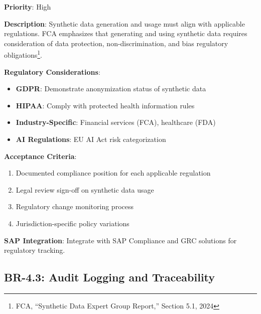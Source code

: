 \begin{tcolorbox}[colback=red!5,colframe=red!70,title=BR-4.2: Compliance Framework Alignment]
\textbf{Priority}: High

\textbf{Description}: Synthetic data generation and usage must align with
applicable regulations. FCA emphasizes that generating and using synthetic data
requires consideration of data protection, non-discrimination, and bias
regulatory obligations\footnote{FCA, ``Synthetic Data Expert Group Report,''
Section 5.1, 2024}.

\textbf{Regulatory Considerations}:
\begin{itemize}
  \item \textbf{GDPR}: Demonstrate anonymization status of synthetic data
  \item \textbf{HIPAA}: Comply with protected health information rules
  \item \textbf{Industry-Specific}: Financial services (FCA), healthcare (FDA)
  \item \textbf{AI Regulations}: EU AI Act risk categorization
\end{itemize}

\textbf{Acceptance Criteria}:
\begin{enumerate}
  \item Documented compliance position for each applicable regulation
  \item Legal review sign-off on synthetic data usage
  \item Regulatory change monitoring process
  \item Jurisdiction-specific policy variations
\end{enumerate}

\textbf{SAP Integration}: Integrate with SAP Compliance and GRC solutions for
regulatory tracking.
\end{tcolorbox}

\subsection{BR-4.3: Audit Logging and Traceability}

